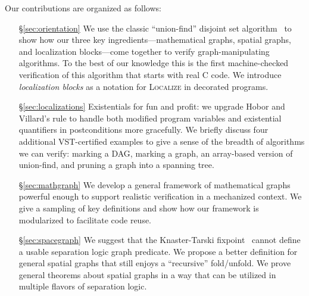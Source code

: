 Our contributions are organized as follows:
\begin{itemize}
\item[\S\ref{sec:orientation}] We use the classic ``union-find'' disjoint set algorithm~\cite{clrs} to show how our three key ingredients---mathematical graphs, spatial graphs, and localization blocks---come together to verify
graph-manipulating algorithms.
To the best of our knowledge this is the first machine-checked verification of this algorithm that starts with real C code.
We introduce \emph{localization blocks} as a notation for \textsc{Localize} in decorated programs. 
\item[\S\ref{sec:localizations}] {\color{magenta}Existentials for fun and profit: we upgrade Hobor and Villard's  rule to handle both modified program variables and existential quantifiers in postconditions more gracefully.
    We briefly discuss four additional VST-certified examples to give a sense of the breadth of algorithms we can verify: marking a DAG, marking a graph, an array-based version of union-find, and pruning a graph into a spanning tree.} %
\item[\S\ref{sec:mathgraph}] We develop a general framework of mathematical graphs powerful enough to support realistic verification in a mechanized context.  We give a sampling of key definitions and show how our framework is modularized to facilitate code reuse.
\item[\S\ref{sec:spacegraph}] {\color{magenta}We suggest that the Knaster-Tarski fixpoint~\cite{tarski:fixpoint} cannot define a usable separation logic graph predicate.  We propose a better definition for general spatial graphs that still enjoys a ``recursive'' fold/unfold.  We prove general theorems about spatial graphs in a way that can be utilized in multiple flavors of separation logic.} %

\end{itemize}
